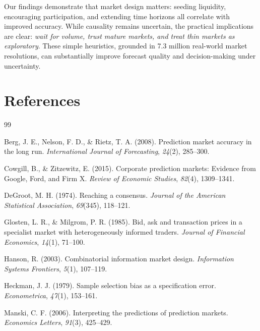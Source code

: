 \documentclass[12pt,letterpaper]{article}
\begin{document}
Our findings demonstrate that market design matters: seeding liquidity, encouraging participation, and extending time horizons all correlate with improved accuracy. While causality remains uncertain, the practical implications are clear: \textit{wait for volume, trust mature markets, and treat thin markets as exploratory}. These simple heuristics, grounded in 7.3 million real-world market resolutions, can substantially improve forecast quality and decision-making under uncertainty.

\clearpage
\section*{References}

\begin{thebibliography}{99}

Berg, J. E., Nelson, F. D., \& Rietz, T. A. (2008).
\newblock Prediction market accuracy in the long run.
\newblock \textit{International Journal of Forecasting}, \textit{24}(2), 285--300.

Cowgill, B., \& Zitzewitz, E. (2015).
\newblock Corporate prediction markets: Evidence from Google, Ford, and Firm X.
\newblock \textit{Review of Economic Studies}, \textit{82}(4), 1309--1341.

DeGroot, M. H. (1974).
\newblock Reaching a consensus.
\newblock \textit{Journal of the American Statistical Association}, \textit{69}(345), 118--121.

Glosten, L. R., \& Milgrom, P. R. (1985).
\newblock Bid, ask and transaction prices in a specialist market with heterogeneously informed traders.
\newblock \textit{Journal of Financial Economics}, \textit{14}(1), 71--100.

Hanson, R. (2003).
\newblock Combinatorial information market design.
\newblock \textit{Information Systems Frontiers}, \textit{5}(1), 107--119.

Heckman, J. J. (1979).
\newblock Sample selection bias as a specification error.
\newblock \textit{Econometrica}, \textit{47}(1), 153--161.

Manski, C. F. (2006).
\newblock Interpreting the predictions of prediction markets.
\newblock \textit{Economics Letters}, \textit{91}(3), 425--429.


\end{thebibliography}
\end{document}
